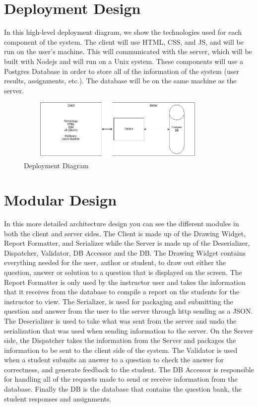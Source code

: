 \chapter{Deployment Design}
      In this high-level deployment diagram, we show the technologies used for each component of the system. The client will use HTML, CSS, and JS, and will be run on the user’s machine. This will communicated with the server, which will be built with Nodejs and will run on a Unix system. These components will use a Postgres Database in order to store all of the information of the system (user results, assignments, etc.). The database will be on the same machine as the server.
                        \begin{figure}[H]
            \centerline{\includegraphics[height=3cm, width=10cm]{Deployment.jpg}}
            \caption{Deployment Diagram}
    \end{figure}
    
\chapter{Modular Design}
In this more detailed architecture design you can see the different modules in both the client and server sides.  The Client is made up of the Drawing Widget, Report Formatter, and Serializer while the Server is made up of the Deserializer, Dispatcher, Validator, DB Accessor and the DB.  The Drawing Widget contains everything needed for the user, author or student, to draw out either the question, answer or solution to a question that is displayed on the screen.  The Report Formatter is only used by the instructor user and takes the information that it receives from the database to compile a report on the students for the instructor to view.  The Serializer, is used for packaging and submitting the question and answer from the user to the server through http sending as a JSON.  The Deserializer is used to take what was sent from the server and undo the serialization that was used when sending information to the server.  On the Server side, the Dispatcher takes the information from the Server and packages the information to be sent to the client side of the system.  The Validator is used when a student submits an answer to a question to check the answer for correctness, and generate feedback to the student.  The DB Accessor is responsible for handling all of the requests made to send or receive information from the database.  Finally the DB is the database that contains the question bank, the student responses and assignments.    
 

